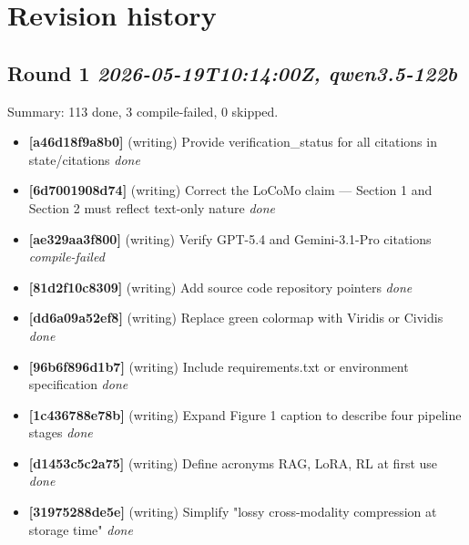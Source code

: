 \documentclass{llmxive}
\begin{document}
\bigskip


\clearpage

\section*{Revision history}
\sloppy
\subsection*{Round 1 \hfill \textit{2026-05-19T10:14:00Z, qwen3.5-122b}}
Summary: 113 done, 3 compile-failed, 0 skipped.
\begin{itemize}\setlength\itemsep{2pt}
\item \textbf{[a46d18f9a8b0]} (writing) Provide verification\_status for all citations in state/citations \hfill \textit{done}
\item \textbf{[6d7001908d74]} (writing) Correct the LoCoMo claim — Section 1 and Section 2 must reflect text-only nature \hfill \textit{done}
\item \textbf{[ae329aa3f800]} (writing) Verify GPT-5.4 and Gemini-3.1-Pro citations \hfill \textit{compile-failed}
\item \textbf{[81d2f10c8309]} (writing) Add source code repository pointers \hfill \textit{done}
\item \textbf{[dd6a09a52ef8]} (writing) Replace green colormap with Viridis or Cividis \hfill \textit{done}
\item \textbf{[96b6f896d1b7]} (writing) Include requirements.txt or environment specification \hfill \textit{done}
\item \textbf{[1c436788e78b]} (writing) Expand Figure 1 caption to describe four pipeline stages \hfill \textit{done}
\item \textbf{[d1453c5c2a75]} (writing) Define acronyms RAG, LoRA, RL at first use \hfill \textit{done}
\item \textbf{[31975288de5e]} (writing) Simplify "lossy cross-modality compression at storage time" \hfill \textit{done}
\end{itemize}
\bigskip
\end{document}

